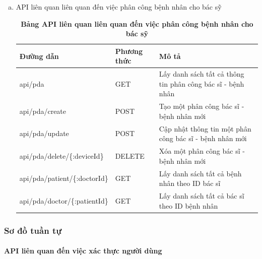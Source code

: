 \begin{enumerate}[a)]
\begin{table}[H]
\begin{tabularx}{0.9\textwidth}{
  | >{\raggedright\arraybackslash}X
  | >{\raggedright\arraybackslash}m{2cm}
  | >{\raggedright\arraybackslash}X|
  }
  \end{tabularx}
  \label{table_api_ecg}
\end{table}


\item API liên quan liên quan đến việc phân công bệnh nhân cho bác sỹ

\begin{table}[H]
  \centering
  \caption{\bfseries \fontsize{12pt}{0pt}\selectfont Bảng API liên quan liên quan đến việc phân công bệnh nhân cho bác sỹ}
  \begin{tabularx}{0.9\textwidth}{
  | >{\raggedright\arraybackslash}X
  | >{\raggedright\arraybackslash}m{2cm}
  | >{\raggedright\arraybackslash}X|
  }
  \hline
  \bfseries Đường dẫn    &\bfseries Phương thức    &\bfseries Mô tả\\ \hline
  api/pda   &   GET  & Lấy danh sách tất cả thông tin phân công bác sĩ - bệnh nhân \\ \hline
  api/pda/create  &    POST    & Tạo một phân công bác sĩ - bệnh nhân mới \\ \hline
  api/pda/update  &    POST    & Cập nhật thông tin một phân công bác sĩ - bệnh nhân mới \\ \hline
  api/pda/delete/\{:deviceId\}  &    DELETE    & Xóa một phân công bác sĩ - bệnh nhân mới \\ \hline
  api/pda/patient/\{:doctorId\} &  GET  & Lấy danh sách tất cả bệnh nhân theo ID bác sĩ \\ \hline
  api/pda/doctor/\{:patientId\} &  GET  & Lấy danh sách tất cả bác sĩ theo ID bệnh nhân \\ \hline


  \end{tabularx}
  \label{table_api_pda}
\end{table}



\end{enumerate}




\subsubsection{Sơ đồ tuần tự}



\paragraph{API liên quan đến việc xác thực người dùng}
\mbox{}

